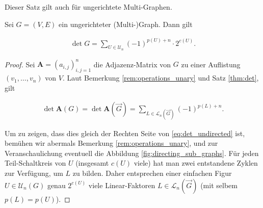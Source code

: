             Dieser Satz gilt auch für ungerichtete Multi-Graphen.

            \begin{corollary} \label{cor:det}

                Sei $G = (V, E)$ ein ungerichteter (Multi-)Graph.
                Dann gilt

                \begin{align} \label{eq:det_undirected}
                    \det G
                    =
                    \sum_{U \in \mathcal U_n}
                        (-1)^{p(U) + n} \cdot 2^{c(U)}.
                \end{align}

            \end{corollary}

            \begin{proof}

                Sei $\mathbf A = (a_{i,j})_{i,j=1}^n$ die Adjazenz-Matrix von $G$ zu einer Auflistung $(v_1, \dots, v_n)$ von $V$.
                Laut Bemerkung \ref{rem:operations_unary} und Satz \ref{thm:det}, gilt

                \begin{align*}
                    \det \mathbf A(G)
                    =
                    \det \mathbf A(\vec G)
                    =
                    \sum_{L \in \mathcal L_n(\vec G)}
                        (-1)^{p(L) + n}.
                \end{align*}

                Um zu zeigen, dass dies gleich der Rechten Seite von \eqref{eq:det_undirected} ist, bemühen wir abermals Bemerkung \ref{rem:operations_unary}, und zur Veranschaulichung eventuell die Abbildung \ref{fig:directing_sub_graphs}.
                Für jeden Teil-Schaltkreis von $U$ (insgesamt $c(U)$ viele) hat man zwei entstandene Zyklen zur Verfügung, um $L$ zu bilden.
                Daher entsprechen einer einfachen Figur $U \in \mathcal U_n(G)$ genau $2^{c(U)}$ viele Linear-Faktoren $L \in \mathcal L_n(\vec G)$ (mit selbem $p(L) = p(U)$).

            \end{proof}

